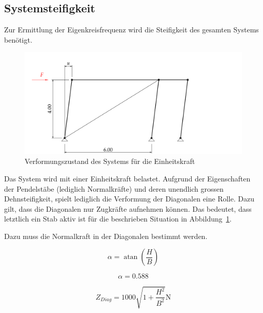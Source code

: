 \documentclass[
  letterpaper,
  DIV=11]{scrreprt}
\begin{document}
\hypertarget{systemsteifigkeit-1}{%
\subsection{Systemsteifigkeit}\label{systemsteifigkeit-1}}

Zur Ermittlung der Eigenkreisfrequenz wird die Steifigkeit des gesamten
Systems benötigt.

\begin{figure}[H]

{\centering \includegraphics{index_files/mediabag/bilder/aufgabe_ems_ge_verformung.pdf}

}

\caption{\label{fig-ems_dampf_verform_FW}Verformungszustand des Systems
für die Einheitskraft}

\end{figure}

Das System wird mit einer Einheitskraft belastet. Aufgrund der
Eigenschaften der Pendelstäbe (lediglich Normalkräfte) und deren
unendlich grossen Dehnsteifigkeit, spielt lediglich die Verformung der
Diagonalen eine Rolle. Dazu gilt, dass die Diagonalen nur Zugkräfte
aufnehmen können. Das bedeutet, dass letztlich ein Stab aktiv ist für
die beschrieben Situation in Abbildung~\ref{fig-ems_dampf_verform_FW}.

Dazu muss die Normalkraft in der Diagonalen bestimmt werden.

\begin{equation}\alpha = \operatorname{atan}{\left(\frac{H}{B} \right)}\end{equation}

\begin{equation}\alpha = 0.588\end{equation}

\begin{equation}Z_{Diag} = 1000 \sqrt{1 + \frac{H^{2}}{B^{2}}} \text{N}\end{equation}
\end{document}
